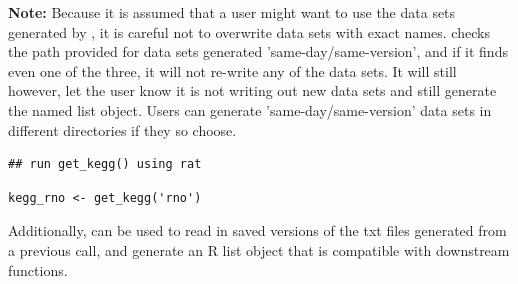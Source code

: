 \documentclass[article]{jss}\usepackage[]{graphicx}\usepackage[]{color}
\makeatletter
\newenvironment{kframe}{%
 \def\at@end@of@kframe{}%
 \ifinner\ifhmode%
  \def\at@end@of@kframe{\end{minipage}}%
  \begin{minipage}{\columnwidth}%
 \fi\fi%
 \def\FrameCommand##1{\hskip\@totalleftmargin \hskip-\fboxsep
 \colorbox{shadecolor}{##1}\hskip-\fboxsep
     \hskip-\linewidth \hskip-\@totalleftmargin \hskip\columnwidth}%
 \MakeFramed {\advance\hsize-\width
   \@totalleftmargin\z@ \linewidth\hsize
   \@setminipage}}%
 {\par\unskip\endMakeFramed%
 \at@end@of@kframe}
\newenvironment{knitrout}{}{} %
\makeatother
\begin{document}
\textbf{Note:} Because it is assumed that a user might want to use the data sets
generated by , it is careful not to overwrite data
sets with exact names.  checks the path provided
for data sets generated 'same-day/same-version', and if it finds even one of the
three, it will not re-write any of the data sets. It will still however, let the
user know it is not writing out new data sets and still generate the named list
object. Users can generate 'same-day/same-version' data sets in different
directories if they so choose.

\begin{knitrout}
\color{fgcolor}\begin{kframe}
\begin{lstlisting}[basicstyle=\ttfamily,breaklines=true]
## run get_kegg() using rat\end{lstlisting}
\begin{lstlisting}[basicstyle=\ttfamily,breaklines=true]
kegg_rno <- get_kegg('rno')\end{lstlisting}


{\ttfamily\noindent\itshape\color{messagecolor}{\#\# These files already exist in your working directory. New files will not be generated.}}

{\ttfamily\noindent\itshape\color{messagecolor}{\#\# Kegg Release: Release\_92.0+\_12-05\_Dec\_19}}\end{kframe}
\end{knitrout}

Additionally,  can be used to read in saved
versions of the txt files generated from a previous call, and generate an R list
object that is compatible with downstream functions.
\end{document}

